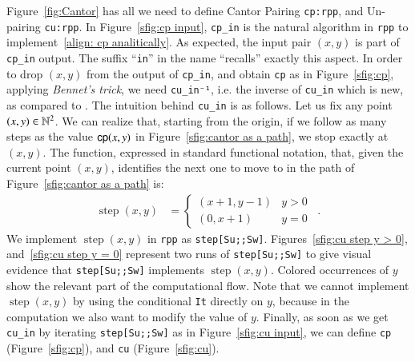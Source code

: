 \documentclass[preprint]{elsarticle}
\theoremstyle{remark}
\begin{document}
Figure~\ref{fig:Cantor} has all we need to define Cantor Pairing \lstinline|cp:rpp|, and Un-pairing \lstinline|cu:rpp|.
In Figure~\ref{sfig:cp input}, \lstinline|cp_in| is the natural algorithm in \lstinline|rpp| to implement~\eqref{align: cp analitically}. As expected, the input pair $(x,y)$ is part of \lstinline|cp_in| output. The suffix ``\lstinline|in|'' in the name ``recalls'' exactly this aspect. In order to drop $(x,y)$ from the output of \lstinline|cp_in|, and obtain \lstinline|cp| as in Figure~\ref{sfig:cp}, applying {\it Bennet's trick}, we need \lstinline|cu_in⁻¹|, i.e. the inverse of \lstinline|cu_in| which is new, as compared to \cite{DBLP:journals/tcs/PaoliniPR20}. The intuition behind \lstinline|cu_in| is as follows. Let us fix any point $ (x, y) \in \mathbb{N}^2 $. We can realize that, starting from the origin, if we follow as many steps as the value $ \mathsf{cp}(x, y) $ in Figure~\ref{sfig:cantor as a path}, we stop exactly at $ (x,y) $. The function, expressed in standard functional notation, that, given the current point $ (x,y) $, identifies the next one to move to in the path of Figure~\ref{sfig:cantor as a path} is:
\begin{align*}
    \operatorname{step}(x,y) & =
    \begin{cases} (x+1,y-1) &  y > 0 \\ (0, x+1) &   y = 0 \end{cases}
    \enspace .
\end{align*}
We implement $ \operatorname{step}(x,y) $ in \lstinline|rpp| as \lstinline|step[Su;;Sw]|. Figures~\ref{sfig:cu step y > 0}, and~\ref{sfig:cu step y = 0} represent two runs of \lstinline|step[Su;;Sw]| to give visual evidence that \lstinline|step[Su;;Sw]| implements $\operatorname{step}(x,y)$. Colored occurrences of $ y $ show the relevant part of the computational flow. Note that we cannot implement $ \operatorname{step}(x,y) $ by using the conditional \lstinline|It| directly on $y$, because in the computation we also want to modify the value of $y$. Finally, as soon as we get \lstinline|cu_in| by iterating \lstinline|step[Su;;Sw]| as in Figure~\ref{sfig:cu input}, we can define \lstinline|cp| (Figure~\ref{sfig:cp}), and \lstinline|cu| (Figure~\ref{sfig:cu}).
\end{document}
